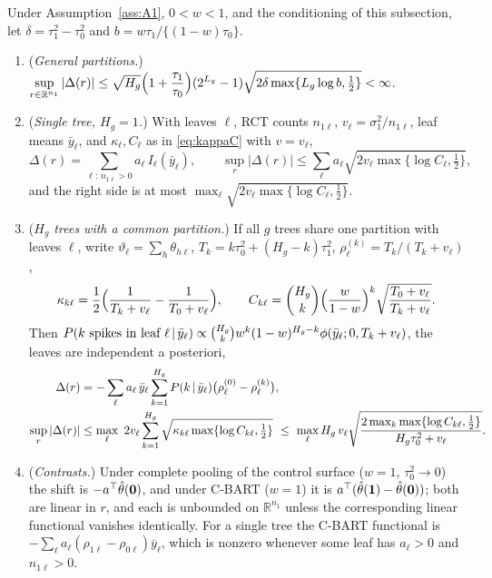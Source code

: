 \begin{corA}\label{cor:estimand}
Under Assumption~\ref{ass:A1}, $0<w<1$, and the conditioning of this subsection, let $\delta=\tau_1^2-\tau_0^2$ and $b=w\tau_1/\{(1-w)\tau_0\}$.
\begin{enumerate}[label=(\alph*),leftmargin=2.2em]
\item (\emph{General partitions.}) $\displaystyle\sup_{r\in\mathbb R^{n_1}}|\Delta(r)|\le \sqrt{H_g}\Bigl(1+\frac{\tau_1}{\tau_0}\Bigr)(2^{L_g}-1)\sqrt{2\delta\max\{L_g\log b,\tfrac12\}}<\infty$.
\item (\emph{Single tree, $H_g=1$.}) With leaves $\ell$, RCT counts $n_{1\ell}$, $v_\ell=\sigma_1^2/n_{1\ell}$, leaf means $\bar y_\ell$, and $\kappa_\ell,C_\ell$ as in \eqref{eq:kappaC} with $v=v_\ell$,
\[
\Delta(r)=\sum_{\ell:\,n_{1\ell}>0}a_\ell\,I_\ell(\bar y_\ell),\qquad
\sup_r|\Delta(r)|\le\sum_\ell a_\ell\sqrt{2v_\ell\max\{\log C_\ell,\tfrac12\}} ,
\]
and the right side is at most $\max_\ell\sqrt{2v_\ell\max\{\log C_\ell,\tfrac12\}}$.
\item (\emph{$H_g$ trees with a common partition.}) If all $g$ trees share one partition with leaves $\ell$, write $\vartheta_\ell=\sum_h\theta_{h\ell}$, $T_k=k\tau_0^2+(H_g-k)\tau_1^2$, $\rho^{(k)}_\ell=T_k/(T_k+v_\ell)$,
\[
\kappa_{k\ell}=\frac12\Bigl(\frac1{T_k+v_\ell}-\frac1{T_0+v_\ell}\Bigr),\qquad
C_{k\ell}=\binom{H_g}{k}\Bigl(\frac{w}{1-w}\Bigr)^{k}\sqrt{\frac{T_0+v_\ell}{T_k+v_\ell}} .
\]
Then $P(k\ \text{spikes in leaf }\ell\,\vert\,\bar y_\ell)\propto\binom{H_g}{k}w^k(1-w)^{H_g-k}\phi(\bar y_\ell;0,T_k+v_\ell)$, the leaves are independent a posteriori,
\begin{align}
\Delta(r)&=-\sum_\ell a_\ell\,\bar y_\ell\sum_{k=1}^{H_g}P(k\given\bar y_\ell)\bigl(\rho^{(0)}_\ell-\rho^{(k)}_\ell\bigr),
\label{eq:Delta-common}\\
\sup_r|\Delta(r)|&\le\max_\ell\ 2v_\ell\sum_{k=1}^{H_g}\sqrt{\kappa_{k\ell}\max\{\log C_{k\ell},\tfrac12\}}
\ \le\ \max_\ell H_g\,v_\ell\sqrt{\frac{2\max_k\max\{\log C_{k\ell},\tfrac12\}}{H_g\tau_0^2+v_\ell}} .
\label{eq:Delta-common-bound}
\end{align}
\item (\emph{Contrasts.}) Under complete pooling of the control surface ($w=1$, $\tau_0^2\to0$) the shift is $-a^{\top}\hat\theta(\mathbf 0)$, and under C-BART ($w=1$) it is $a^{\top}(\hat\theta(\mathbf 1)-\hat\theta(\mathbf 0))$; both are linear in $r$, and each is unbounded on $\mathbb R^{n_1}$ unless the corresponding linear functional vanishes identically. For a single tree the C-BART functional is $-\sum_\ell a_\ell(\rho_{1\ell}-\rho_{0\ell})\bar y_\ell$, which is nonzero whenever some leaf has $a_\ell>0$ and $n_{1\ell}>0$.
\end{enumerate}
\end{corA}

